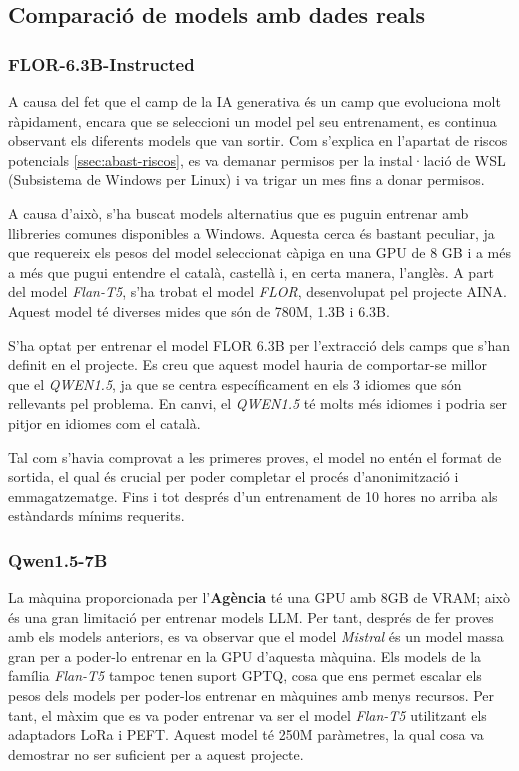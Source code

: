 \subsection{Comparació de models amb dades reals}

\subsubsection{FLOR-6.3B-Instructed}
A causa del fet que el camp de la IA generativa és un camp que evoluciona molt ràpidament, encara que se seleccioni un model pel seu entrenament, es continua observant els diferents models que van sortir. Com s'explica en l'apartat de riscos potencials \ref{ssec:abast-riscos}, es va demanar permisos per la instal·lació de WSL (Subsistema de Windows per Linux) i va trigar un mes fins a donar permisos.

A causa d'això, s'ha buscat models alternatius que es puguin entrenar amb llibreries comunes disponibles a Windows. Aquesta cerca és bastant peculiar, ja que requereix els pesos del model seleccionat càpiga en una GPU de 8 GB i a més a més que pugui entendre el català, castellà i, en certa manera, l'anglès. A part del model \textit{Flan-T5}, s'ha trobat el model \textit{FLOR}, desenvolupat pel projecte AINA. Aquest model té diverses mides que són de 780M, 1.3B i 6.3B.

S'ha optat per entrenar el model FLOR 6.3B per l'extracció dels camps que s'han definit en el projecte. Es creu que aquest model hauria de comportar-se millor que el \textit{QWEN1.5}, ja que se centra específicament en els 3 idiomes que són rellevants pel problema. En canvi, el \textit{QWEN1.5} té molts més idiomes i podria ser pitjor en idiomes com el català.

Tal com s'havia comprovat a les primeres proves, el model no entén el format de sortida, el qual és crucial per poder completar el procés d'anonimització i emmagatzematge. Fins i tot després d'un entrenament de 10 hores no arriba als estàndards mínims requerits.

\subsubsection{Qwen1.5-7B}
La màquina proporcionada per l'\textbf{Agència} té una GPU amb 8GB de VRAM; això és una gran limitació per entrenar models LLM. Per tant, després de fer proves amb els models anteriors, es va observar que el model \textit{Mistral} és un model massa gran per a poder-lo entrenar en la GPU d'aquesta màquina. Els models de la família \textit{Flan-T5} tampoc tenen suport GPTQ, cosa que ens permet escalar els pesos dels models per poder-los entrenar en màquines amb menys recursos. Per tant, el màxim que es va poder entrenar va ser el model \textit{Flan-T5} utilitzant els adaptadors LoRa i PEFT. Aquest model té 250M paràmetres, la qual cosa va demostrar no ser suficient per a aquest projecte.

